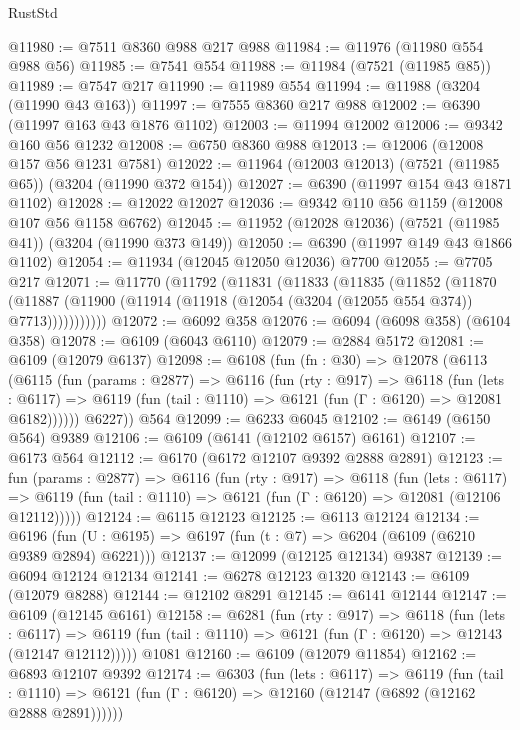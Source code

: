 \begin{lexlean}{RustStd}
\begin{coremodule}
@11980 := @7511 @8360 @988 @217 @988
@11984 := @11976 (@11980 @554 @988 @56)
@11985 := @7541 @554
@11988 := @11984 (@7521 (@11985 @85))
@11989 := @7547 @217
@11990 := @11989 @554
@11994 := @11988 (@3204 (@11990 @43 @163))
@11997 := @7555 @8360 @217 @988
@12002 := @6390 (@11997 @163 @43 @1876 @1102)
@12003 := @11994 @12002
@12006 := @9342 @160 @56 @1232
@12008 := @6750 @8360 @988
@12013 := @12006 (@12008 @157 @56 @1231 @7581)
@12022 := @11964 (@12003 @12013) (@7521 (@11985 @65)) (@3204 (@11990 @372 @154))
@12027 := @6390 (@11997 @154 @43 @1871 @1102)
@12028 := @12022 @12027
@12036 := @9342 @110 @56 @1159 (@12008 @107 @56 @1158 @6762)
@12045 := @11952 (@12028 @12036) (@7521 (@11985 @41)) (@3204 (@11990 @373 @149))
@12050 := @6390 (@11997 @149 @43 @1866 @1102)
@12054 := @11934 (@12045 @12050 @12036) @7700
@12055 := @7705 @217
@12071 := @11770
    (@11792
      (@11831
        (@11833
          (@11835
            (@11852
              (@11870
                (@11887 (@11900 (@11914 (@11918 (@12054 (@3204 (@12055 @554 @374)) @7713)))))))))))
@12072 := @6092 @358
@12076 := @6094 (@6098 @358) (@6104 @358)
@12078 := @6109 (@6043 @6110)
@12079 := @2884 @5172
@12081 := @6109 (@12079 @6137)
@12098 := @6108
    (fun (fn : @30) =>
    @12078
      (@6113
        (@6115
          (fun (params : @2877) =>
          @6116
            (fun (rty : @917) =>
            @6118
              (fun (lets : @6117) =>
              @6119 (fun (tail : @1110) => @6121 (fun (Γ : @6120) => @12081 @6182))))))
        @6227))
    @564
@12099 := @6233 @6045
@12102 := @6149 (@6150 @564) @9389
@12106 := @6109 (@6141 (@12102 @6157) @6161)
@12107 := @6173 @564
@12112 := @6170 (@6172 @12107 @9392 @2888 @2891)
@12123 := fun (params : @2877) =>
  @6116
    (fun (rty : @917) =>
    @6118
      (fun (lets : @6117) =>
      @6119 (fun (tail : @1110) => @6121 (fun (Γ : @6120) => @12081 (@12106 @12112)))))
@12124 := @6115 @12123
@12125 := @6113 @12124
@12134 := @6196 (fun (U : @6195) => @6197 (fun (t : @7) => @6204 (@6109 (@6210 @9389 @2894) @6221)))
@12137 := @12099 (@12125 @12134) @9387
@12139 := @6094 @12124 @12134
@12141 := @6278 @12123 @1320
@12143 := @6109 (@12079 @8288)
@12144 := @12102 @8291
@12145 := @6141 @12144
@12147 := @6109 (@12145 @6161)
@12158 := @6281
    (fun (rty : @917) =>
    @6118
      (fun (lets : @6117) =>
      @6119 (fun (tail : @1110) => @6121 (fun (Γ : @6120) => @12143 (@12147 @12112)))))
    @1081
@12160 := @6109 (@12079 @11854)
@12162 := @6893 @12107 @9392
@12174 := @6303
    (fun (lets : @6117) =>
    @6119
      (fun (tail : @1110) =>
      @6121 (fun (Γ : @6120) => @12160 (@12147 (@6892 (@12162 @2888 @2891))))))

\end{coremodule}
\end{lexlean}
